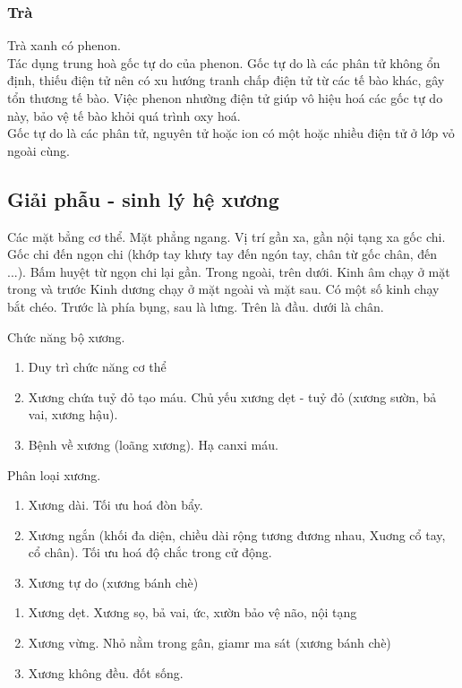 \subsubsection{Trà}
Trà xanh có phenon. \\

Tác dụng trung hoà gốc tự do của phenon. Gốc tự do là các phân tử không ổn định, thiếu điện tử nên có xu hướng tranh chấp điện tử từ các tế bào khác, gây tổn thương tế bào. Việc phenon nhường điện tử giúp vô hiệu hoá các gốc tự do này, bảo vệ tế bào khỏi quá trình oxy hoá. \\

Gốc tự do là các phân tử, nguyên tử hoặc ion có một hoặc nhiều điện tử ở lớp vỏ ngoài cùng.

\subsection{Giải phẫu - sinh lý hệ xương}
Các mặt bẳng cơ thể.
Mặt phẳng ngang.
Vị trí gần xa, gần nội tạng xa gốc chi. Gốc chi đến ngọn chi (khớp tay khưy tay đến ngón tay, chân từ gốc chân, đến ...).
Bấm huyệt từ ngọn chi lại gần.
Trong ngoài, trên dưới.
Kinh âm chạy ở mặt trong và trước
Kinh dương chạy ở mặt ngoài và mặt sau.
Có một số kinh chạy bắt chéo.
Trước là phía bụng, sau là lưng.
Trên là đầu. dưới là chân.

Chức năng bộ xương.
\begin{enumerate}
    \item Duy trì chức năng cơ thể
    \item Xương chứa tuỷ đỏ tạo máu. Chủ yếu xương dẹt - tuỷ đỏ (xương sườn, bả vai, xương hậu).
    \item Bệnh về xương (loãng xương). Hạ canxi máu.
\end{enumerate}

Phân loại xương.
\begin{enumerate}
    \item Xương dài. Tối ưu hoá đòn bẩy.
    \item Xương ngắn (khối đa diện, chiều dài rộng tương đương nhau, Xuơng cổ tay, cổ chân). Tối ưu hoá độ chắc trong cử động.
    \item Xương tự do (xương bánh chè)
\end{enumerate}

\begin{enumerate}
    \item Xương dẹt. Xương sọ, bả vai, ức, xườn bảo vệ não, nội tạng
    \item Xương vừng. Nhỏ nằm trong gân, giamr ma sát (xương bánh chè)
    \item Xương không đều. đốt sống.
\end{enumerate}


